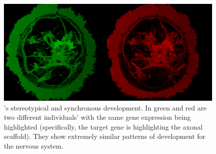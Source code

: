 \begin{figure}[bth]
  \includegraphics[width=\linewidth]{gfx/chapter1/brain_comparison.png}
  \caption{\platyfull{}'s stereotypical and synchronous development. In green and red are two different \platy{} individuals' with the same gene expression being highlighted (specifically, the target gene is  highlighting the axonal scaffold). They show extremely similar patterns of development for the nervous system.}
  \label{fig:brain_comparison}
\end{figure}

	 
